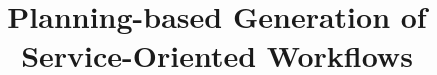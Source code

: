 \documentclass{acm_proc_article-sp}
\begin{document}

\title{Planning-based Generation of Service-Oriented Workflows}

%
%
%
%
%
\end{document}
